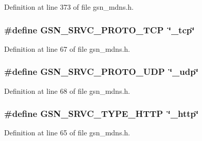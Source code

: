 Definition at line 373 of file gsn\_\-mdns.h.

\hypertarget{a00526_aca9d27f09492bb603d2c868b5214913f}{
\subsubsection[{GSN\_\-SRVC\_\-PROTO\_\-TCP}]{\setlength{\rightskip}{0pt plus 5cm}\#define GSN\_\-SRVC\_\-PROTO\_\-TCP~\char`\"{}\_\-tcp\char`\"{}}}
\label{a00526_aca9d27f09492bb603d2c868b5214913f}


Definition at line 67 of file gsn\_\-mdns.h.

\hypertarget{a00526_a2da369ee106c23e9706a188b2c0861eb}{
\subsubsection[{GSN\_\-SRVC\_\-PROTO\_\-UDP}]{\setlength{\rightskip}{0pt plus 5cm}\#define GSN\_\-SRVC\_\-PROTO\_\-UDP~\char`\"{}\_\-udp\char`\"{}}}
\label{a00526_a2da369ee106c23e9706a188b2c0861eb}


Definition at line 68 of file gsn\_\-mdns.h.

\hypertarget{a00526_a57741fb286c26a34de7daf93a2e278ad}{
\subsubsection[{GSN\_\-SRVC\_\-TYPE\_\-HTTP}]{\setlength{\rightskip}{0pt plus 5cm}\#define GSN\_\-SRVC\_\-TYPE\_\-HTTP~\char`\"{}\_\-http\char`\"{}}}
\label{a00526_a57741fb286c26a34de7daf93a2e278ad}


Definition at line 65 of file gsn\_\-mdns.h.



